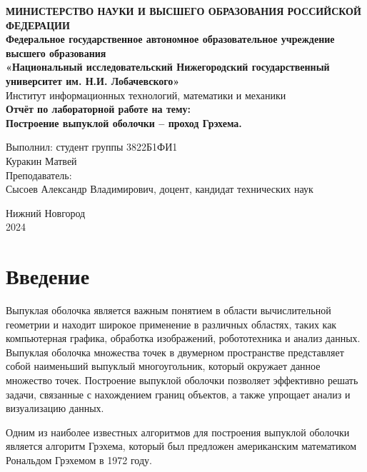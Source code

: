 \documentclass[12pt]{article}
\begin{document}
\begin{titlepage}
\begin{center}
\textbf{МИНИСТЕРСТВО НАУКИ И ВЫСШЕГО ОБРАЗОВАНИЯ РОССИЙСКОЙ ФЕДЕРАЦИИ} \\[0.5cm]
\textbf{Федеральное государственное автономное образовательное учреждение высшего образования} \\[0.5cm]
\textbf{«Национальный исследовательский Нижегородский государственный университет им. Н.И. Лобачевского»} \\[0.5cm]
Институт информационных технологий, математики и механики \\
\vfill
{\Large
\textbf{Отчёт по лабораторной работе на тему:} \\[0.5cm]
\textbf{Построение выпуклой оболочки – проход Грэхема.} \\
}
\vfill
\begin{flushright}
Выполнил: студент группы 3822Б1ФИ1 \\
Куракин Матвей \\
\vspace{1cm}
Преподаватель: \\
Сысоев Александр Владимирович, доцент, кандидат технических наук \\
\end{flushright}
\vfill
Нижний Новгород \\
2024
\end{center}
\end{titlepage}

\tableofcontents
\newpage

\section*{Введение}

Выпуклая оболочка является важным понятием в области вычислительной геометрии и находит широкое применение в различных областях, таких как компьютерная графика, обработка изображений, робототехника и анализ данных. Выпуклая оболочка множества точек в двумерном пространстве представляет собой наименьший выпуклый многоугольник, который окружает данное множество точек. Построение выпуклой оболочки позволяет эффективно решать задачи, связанные с нахождением границ объектов, а также упрощает анализ и визуализацию данных.

Одним из наиболее известных алгоритмов для построения выпуклой оболочки является алгоритм Грэхема, который был предложен американским математиком Рональдом Грэхемом в 1972 году. 
\end{document}
